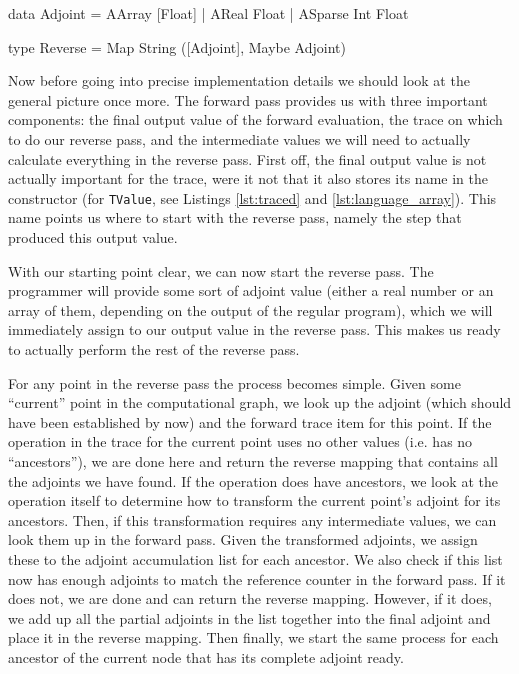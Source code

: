         \begin{haskell}[caption=Definition of the \texttt{Adjoint} type, label=lst:reverse_def, gobble=12]
            data Adjoint
                = AArray  [Float]
                | AReal   Float
                | ASparse Int Float

            type Reverse = Map String ([Adjoint], Maybe Adjoint)
        \end{haskell}

        Now before going into precise implementation details we should look at the general picture once more.
        The forward pass provides us with three important components: the final output value of the forward evaluation, the trace on which to do our reverse pass, and the intermediate values we will need to actually calculate everything in the reverse pass.
        First off, the final output value is not actually important for the trace, were it not that it also stores its name in the constructor (for \texttt{TValue}, see Listings \ref{lst:traced} and \ref{lst:language_array}).
        This name points us where to start with the reverse pass, namely the step that produced this output value.

        With our starting point clear, we can now start the reverse pass.
        The programmer will provide some sort of adjoint value (either a real number or an array of them, depending on the output of the regular program), which we will immediately assign to our output value in the reverse pass.
        This makes us ready to actually perform the rest of the reverse pass.

        For any point in the reverse pass the process becomes simple.
        Given some ``current'' point in the computational graph, we look up the adjoint (which should have been established by now) and the forward trace item for this point.
        If the operation in the trace for the current point uses no other values (i.e. has no ``ancestors''), we are done here and return the reverse mapping that contains all the adjoints we have found.
        If the operation does have ancestors, we look at the operation itself to determine how to transform the current point's adjoint for its ancestors.
        Then, if this transformation requires any intermediate values, we can look them up in the forward pass.
        Given the transformed adjoints, we assign these to the adjoint accumulation list for each ancestor.
        We also check if this list now has enough adjoints to match the reference counter in the forward pass.
        If it does not, we are done and can return the reverse mapping.
        However, if it does, we add up all the partial adjoints in the list together into the final adjoint and place it in the reverse mapping.
        Then finally, we start the same process for each ancestor of the current node that has its complete adjoint ready.

